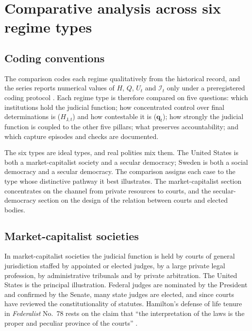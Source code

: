 \documentclass[11pt,letterpaper]{article}
\theoremstyle{definition}
\theoremstyle{remark}
\newcommand{\pJ}{\mathsf{J}}
\newcommand{\Integ}{\mathcal{I}}
\begin{document}
\section{Comparative analysis across six regime types}
\label{sec:comparative}

\subsection{Coding conventions}

The comparison codes each regime qualitatively from the historical record, and the series reports numerical values of $H$, $Q$, $U_t$ and $\Integ_t$ only under a preregistered coding protocol \citep{largo2026hbs}. Each regime type is therefore compared on five questions: which institutions hold the judicial function; how concentrated control over final determinations is ($H_{\pJ,t}$) and how contestable it is ($\mathbf{q}_t$); how strongly the judicial function is coupled to the other five pillars; what preserves accountability; and which capture episodes and checks are documented.

The six types are ideal types, and real polities mix them. The United States is both a market-capitalist society and a secular democracy; Sweden is both a social democracy and a secular democracy. The comparison assigns each case to the type whose distinctive pathway it best illustrates. The market-capitalist section concentrates on the channel from private resources to courts, and the secular-democracy section on the design of the relation between courts and elected bodies.

\subsection{Market-capitalist societies}

In market-capitalist societies the judicial function is held by courts of general jurisdiction staffed by appointed or elected judges, by a large private legal profession, by administrative tribunals and by private arbitration. The United States is the principal illustration. Federal judges are nominated by the President and confirmed by the Senate, many state judges are elected, and since \citet{marbury1803} courts have reviewed the constitutionality of statutes. Hamilton's defense of life tenure in \emph{Federalist} No.~78 rests on the claim that ``the interpretation of the laws is the proper and peculiar province of the courts'' \citep{hamilton1788}.
\end{document}
